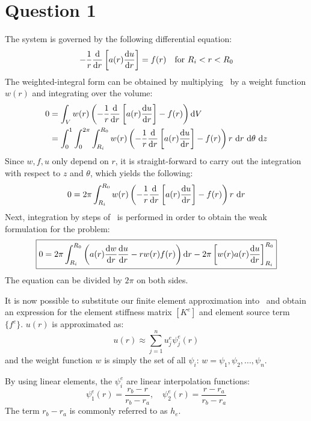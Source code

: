 \section{Question 1}
The system is governed by the following differential equation:
\begin{equation}
    \label{eq:govern}
    -\frac{1}{r} \frac{\text{d}}{\text{d}r}\left[
        a(r)  \frac{\text{d}u}{\text{d}r} \right]
    = f(r) \quad \text{for}~ R_i < r < R_0
\end{equation}
The weighted-integral form can be obtained by multiplying~ by a weight
function $w(r)$ and integrating over the volume:
\newcommand{\termg}{\ensuremath{
    -\frac{1}{r}\diff{}{r}\left[
        a(r) \diff{u}{r} \right]
}}
\begin{align*}
    0 &= \int_V w(r) \left( \termg - f(r) \right) \text{d}V \\
    &= \int_0^1 \int_0^{2\pi}
        \int_{R_i}^{R_0} w(r) \left( \termg - f(r) \right) r~ \text{d}r
        ~\text{d}\theta~\text{d}z
\end{align*}
Since $w, f, u$ only depend on $r$, it is straight-forward to carry out the integration
with respect to $z$ and $\theta$, which yields the following:
\begin{equation}
    \label{eq:weight}
    0 = 2\pi
        \int_{R_i}^{R_0} w(r) \left( \termg - f(r) \right) r~ \text{d}r
\end{equation}
Next, integration by steps of~ is performed in order to obtain
the weak formulation for the problem:
\begin{equation}
    \label{eq:weak}
    \boxed{
    0 = 2\pi
        \int_{R_i}^{R_0} \left( a(r)  \frac{\text{d}w}{\text{d}r} \frac{\text{d}u}{\text{d}r} - rw(r)f(r) \right) \text{d}r
        - 2\pi \left[ w(r)a(r)  \frac{\text{d}u}{\text{d}r} \right]^{R_0}_{R_i}
    }
\end{equation}
The equation can be divided by $2\pi$ on both sides.

It is now possible to substitute our finite element approximation into~ and
obtain an expression for the element stiffness matrix $[K^e]$ and element source term
$\{f^e\}$. $u(r)$ is approximated as:
\begin{equation}
    \label{eq:u}
    u(r) \approx \sum_{j=1}^n u_j^e \psi_j^e(r)
\end{equation}
and the weight function $w$ is simply the set of all $\psi_i$:
$w = \psi_1, \psi_2, ..., \psi_n$.

By using linear elements, the $\psi^e_i$ are linear interpolation functions:
$$
    \psi_1^e(r) = \frac{r_b - r}{r_b - r_a}, \quad
    \psi_2^e(r) = \frac{r - r_a}{r_b - r_a}
$$
The term $r_b - r_a$ is commonly referred to as $h_e$.

